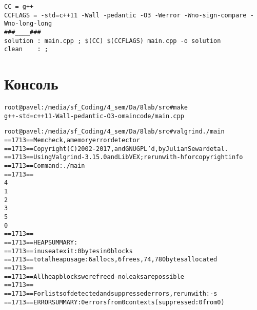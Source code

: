 \lstset{language=[gnu] make}

\begin{lstlisting}
CC = g++
CCFLAGS = -std=c++11 -Wall -pedantic -O3 -Werror -Wno-sign-compare -Wno-long-long
###____###
solution : main.cpp ; $(CC) $(CCFLAGS) main.cpp -o solution
clean	 : ;
\end{lstlisting}

\pagebreak

\section{Консоль}

\begin{alltt}



root@pavel:/media/sf_Coding/4_sem/Da/8lab/src# make
g++ -std=c++11 -Wall -pedantic -O3 -o main code/main.cpp


root@pavel:/media/sf_Coding/4_sem/Da/8lab/src# valgrind ./main
==1713== Memcheck, a memory error detector
==1713== Copyright (C) 2002-2017, and GNU GPL'd, by Julian Seward et al.
==1713== Using Valgrind-3.15.0 and LibVEX; rerun with -h for copyright info
==1713== Command: ./main
==1713==
4
1
2
3
5
0
==1713==
==1713== HEAP SUMMARY:
==1713== in use at exit: 0 bytes in 0 blocks
==1713== total heap usage: 6 allocs, 6 frees, 74,780 bytes allocated
==1713==
==1713== All heap blocks were freed — no leaks are possible
==1713==
==1713== For lists of detected and suppressed errors, rerun with: -s
==1713== ERROR SUMMARY: 0 errors from 0 contexts (suppressed: 0 from 0)
\end{alltt}

\pagebreak